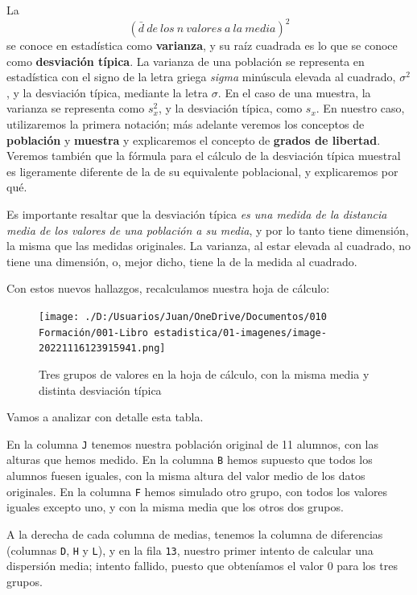 \documentclass[
  letterpaper,
]{scrbook}
\begin{document}
La \[(\bar{d}{\ }de{\ }los{\ }n{\ }valores{\ }a{\ }la{\ }media)^2\] se
conoce en estadística como \textbf{varianza}, y su raíz cuadrada es lo
que se conoce como \textbf{desviación típica}. La varianza de una
población se representa en estadística con el signo de la letra griega
\emph{sigma} minúscula elevada al cuadrado, \(\sigma^2\), y la
desviación típica, mediante la letra \(\sigma\). En el caso de una
muestra, la varianza se representa como \(s_x^2\), y la desviación
típica, como \(s_x\). En nuestro caso, utilizaremos la primera notación;
más adelante veremos los conceptos de \textbf{población} y
\textbf{muestra} y explicaremos el concepto de \textbf{grados de
libertad}. Veremos también que la fórmula para el cálculo de la
desviación típica muestral es ligeramente diferente de la de su
equivalente poblacional, y explicaremos por qué.

Es importante resaltar que la desviación típica \emph{es una medida de
la distancia media de los valores de una población a su media}, y por lo
tanto tiene dimensión, la misma que las medidas originales. La varianza,
al estar elevada al cuadrado, no tiene una dimensión, o, mejor dicho,
tiene la de la medida al cuadrado.

Con estos nuevos hallazgos, recalculamos nuestra hoja de cálculo:

\begin{figure}

{\centering \texttt{[image: ./D:/Usuarios/Juan/OneDrive/Documentos/010 Formación/001-Libro estadistica/01-imagenes/image-20221116123915941.png]}

}

\caption{Tres grupos de valores en la hoja de cálculo, con la misma
media y distinta desviación típica}

\end{figure}

Vamos a analizar con detalle esta tabla.

En la columna \texttt{J} tenemos nuestra población original de 11
alumnos, con las alturas que hemos medido. En la columna \texttt{B}
hemos supuesto que todos los alumnos fuesen iguales, con la misma altura
del valor medio de los datos originales. En la columna \texttt{F} hemos
simulado otro grupo, con todos los valores iguales excepto uno, y con la
misma media que los otros dos grupos.

A la derecha de cada columna de medias, tenemos la columna de
diferencias (columnas \texttt{D}, \texttt{H} y \texttt{L}), y en la fila
\texttt{13}, nuestro primer intento de calcular una dispersión media;
intento fallido, puesto que obteníamos el valor \(0\) para los tres
grupos.
\end{document}

